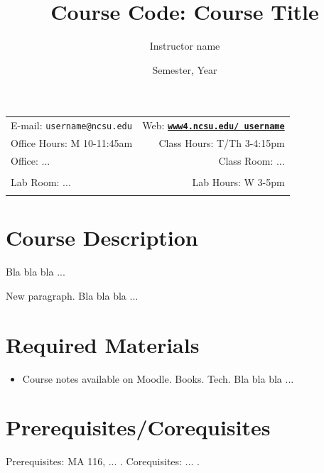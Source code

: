 \documentclass[11pt]{article}
\title{Course Code: Course Title}
\author{Instructor name}
\date{Semester, Year}
\newcommand{\blankline}{\quad\pagebreak[2]}
\begin{document}
\maketitle

\blankline

\begin{tabular*}{.93\textwidth}{@{\extracolsep{\fill}}lr}


E-mail: \texttt{username@ncsu.edu} & Web: \href{www4.ncsu.edu/~username}{\tt\bf www4.ncsu.edu/~username}  \\

 Office Hours: M 10-11:45am  &  Class Hours: T/Th 3-4:15pm \\

 Office: ... & Class Room: ... \\
 & \\
Lab Room: ... & Lab Hours: W 3-5pm \\
&  \\
\hline
\end{tabular*}

\vspace{5 mm}


\section*{Course Description}

Bla bla bla ...

\bigskip

\noindent New paragraph. Bla bla bla ...


\section*{Required Materials}

\begin{itemize}
\item Course notes available on Moodle. Books. Tech. Bla bla bla ...
\end{itemize}


\section*{Prerequisites/Corequisites}
Prerequisites: MA 116, ... .  Corequisites: ... .
\end{document}
